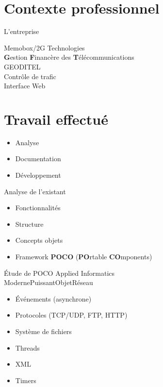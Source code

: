 \documentclass{beamer}
\begin{document}
\section{Contexte professionnel}
\begin{frame}{L'entreprise}
\begin{center}
  Memobox/2G Technologies\\\pause
  {\bf G}estion {\bf F}inancère des {\bf T}élécommunications\\\pause
	  \vfill
  GEODITEL\\\pause
  Contrôle de trafic\\\pause
  \vfill
  Interface Web
  \vfill
\end{center}
\end{frame}
\section{Travail effectu\'e}
\begin{frame}
\begin{itemize}
\vfill
\vfill
\item Analyse\pause
\vfill
\item Documentation\pause
\vfill
\item D\'eveloppement
\vfill
\vfill
\end{itemize}
\end{frame}
\begin{frame}{Analyse de l'existant}
\begin{itemize}
\vfill
\item Fonctionnalités\pause
\item Structure\pause
\item Concepts objets\pause
\vfill
\item Framework {\bf POCO} ({\bf PO}rtable {\bf CO}mponents)
\vfill
\end{itemize}
\end{frame}
\begin{frame}{\'Etude de POCO}
Applied Informatics\\\pause
\vspace{10px}
\hfill Moderne\pause \hfill Puissant\pause \hfill Objet\pause \hfill R\'eseau\pause\hfill\hfill\hfill\\
\vfill
\begin{itemize}
\item \'Ev\'enements (asynchrone)\pause
\item Protocoles (TCP/UDP, FTP, HTTP)\pause
\item Système de fichiers\pause
\item Threads\pause
\item XML\pause
\item Timers
\end{itemize}
\end{frame}
\end{document}
